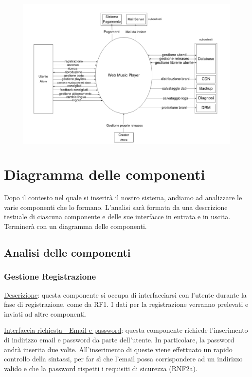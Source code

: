 \documentclass[a4paper,12pt]{article}
\begin{document}
\begin{figure}[htp]
    \centering
    \includegraphics[width=\textwidth]{diagrams/context.png}
\end{figure}

\newpage
\section{Diagramma delle componenti}

Dopo il contesto nel quale si inserirà il nostro sistema, andiamo ad analizzare le varie componenti che lo formano. L'analisi sarà formata da una descrizione testuale di ciascuna componente e delle sue interfacce in entrata e in uscita. Terminerà con un diagramma delle componenti.

\subsection{Analisi delle componenti}

\subsubsection{Gestione Registrazione}

\underline{Descrizione}: questa componente si occupa di interfacciarsi con l’utente durante la fase di registrazione, come da RF1. I dati per la registrazione verranno prelevati e inviati ad altre componenti.

\underline{Interfaccia richiesta - Email e password}: questa componente richiede l'inserimento di indirizzo email e password da parte dell'utente. In particolare, la password andrà inserita due volte. All'inserimento di queste viene effettuato un rapido controllo della sintassi, per far sì che l'email possa corrispondere ad un indirizzo valido e che la password rispetti i requisiti di sicurezza (RNF2a).
\end{document}
